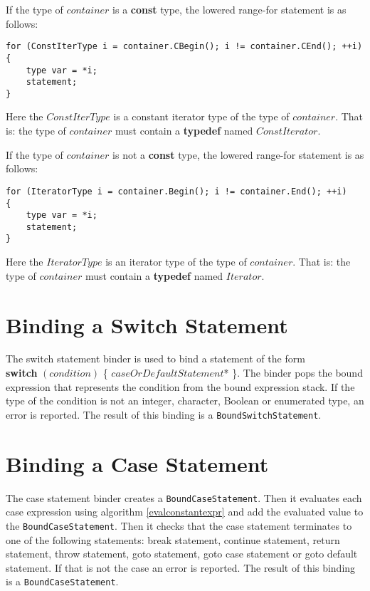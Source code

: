 \documentclass[a4paper,oneside,11pt]{book}
\theoremstyle{definition}
\begin{document}
If the type of $container$ is a \textbf{const} type, the lowered range-for statement is as follows:

\begin{flushleft}
\lstset{language=Cmajor}
\begin{lstlisting}[frame=trBL]
for (ConstIterType i = container.CBegin(); i != container.CEnd(); ++i)
{
    type var = *i;
    statement;
}
\end{lstlisting}

Here the $ConstIterType$ is a constant iterator type of the type of $container$.
That is: the type of $container$ must contain a \textbf{typedef} named $ConstIterator$.
\end{flushleft}

\begin{flushleft}
If the type of $container$ is not a \textbf{const} type, the lowered range-for statement is as follows:
\lstset{language=Cmajor}
\begin{lstlisting}[frame=trBL]
for (IteratorType i = container.Begin(); i != container.End(); ++i)
{
    type var = *i;
    statement;
}
\end{lstlisting}
Here the $IteratorType$ is an iterator type of the type of $container$.
That is: the type of $container$ must contain a \textbf{typedef} named $Iterator$.
\end{flushleft}

\section{Binding a Switch Statement}

The switch statement binder is used to bind a statement of the form\\ \textbf{switch} $(condition)$ \{ $caseOrDefaultStatement$* \}.
The binder pops the bound expression that represents the condition from the bound expression stack.
If the type of the condition is not an integer, character, Boolean or enumerated type, an error is reported.
The result of this binding is a \verb|BoundSwitchStatement|.

\section{Binding a Case Statement}

The case statement binder creates a \verb|BoundCaseStatement|.
Then it evaluates each case expression using algorithm \ref{evalconstantexpr} and add the evaluated value to the \verb|BoundCaseStatement|.
Then it checks that the case statement terminates to one of the following statements:
break statement, continue statement, return statement, throw statement, goto statement, goto case statement or goto default statement.
If that is not the case an error is reported.
The result of this binding is a \verb|BoundCaseStatement|.
\end{document}
